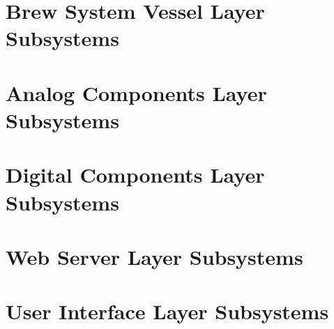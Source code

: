 \documentclass[11pt,letterpaper]{article}
\begin{document}
\section{Brew System Vessel Layer Subsystems}

\newpage
\section{Analog Components Layer Subsystems}

\newpage
\section{Digital Components Layer Subsystems}

\newpage
\section{Web Server Layer Subsystems}

\newpage
\section{User Interface Layer Subsystems}

\newpage



{}
\end{document}
